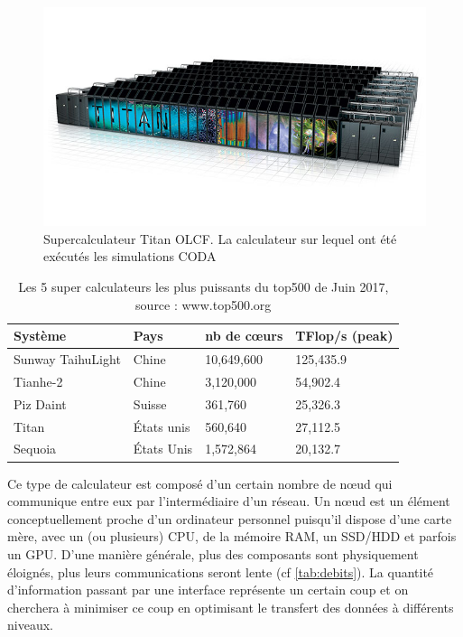 \begin{figure}[bth]
        \includegraphics[width=.95\linewidth]{img/02/titan.jpg} 
        \caption[Titan]{Supercalculateur Titan OLCF.
        La calculateur sur lequel ont été exécutés les simulations CODA}
 		\label{fig:titan}
\end{figure}

\begin{table}[bth]
\begin{tabular}{ l l l l }
\hline 
Système & Pays & nb de cœurs & TFlop/s (peak) \\
\hline 
Sunway TaihuLight & Chine & 10,649,600 & 125,435.9 \\ 
Tianhe-2  & Chine & 3,120,000 & 54,902.4 \\ 
Piz Daint  & Suisse & 361,760 & 25,326.3 \\ 
Titan  & États unis & 560,640 & 27,112.5 \\ 
Sequoia  & États Unis &1,572,864 & 20,132.7 \\ 
\end{tabular} 
\caption[TOP500]{Les 5 super calculateurs les plus puissants du top500 de Juin 2017, source : www.top500.org}
\label{tab:top500}
\end{table}

Ce type de calculateur est composé d'un certain nombre de nœud qui communique entre eux par l'intermédiaire d'un réseau.
Un nœud est un élément conceptuellement proche d'un ordinateur personnel puisqu'il dispose d'une carte mère, avec un (ou plusieurs) \ac{CPU}, de la mémoire RAM, un \ac{SSD}/\ac{HDD} et parfois un \ac{GPU}.
D'une manière générale, plus des composants sont physiquement éloignés, plus leurs communications seront lente (cf \ref{tab:debits}).
La quantité d'information passant par une interface représente un certain coup et on cherchera à minimiser ce coup en optimisant le transfert des données à différents niveaux.

